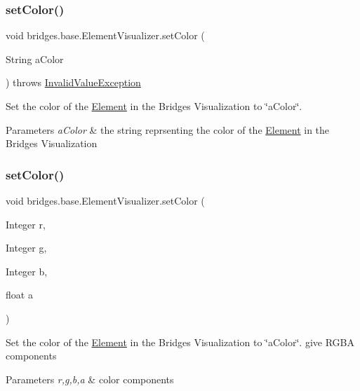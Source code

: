 \subsubsection{\texorpdfstring{set\+Color()}{setColor()}\hspace{0.1cm}{\footnotesize\ttfamily [1/3]}}
{\footnotesize\ttfamily void bridges.\+base.\+Element\+Visualizer.\+set\+Color (\begin{DoxyParamCaption}\item[{String}]{a\+Color }\end{DoxyParamCaption}) throws \hyperlink{classbridges_1_1validation_1_1_invalid_value_exception}{Invalid\+Value\+Exception}}

Set the color of the \hyperlink{classbridges_1_1base_1_1_element}{Element} in the Bridges Visualization to \char`\"{}a\+Color\char`\"{}. 
\begin{DoxyParams}{Parameters}
{\em a\+Color} & the string reprsenting the color of the \hyperlink{classbridges_1_1base_1_1_element}{Element} in the Bridges Visualization \\
\hline
\end{DoxyParams}
\hypertarget{classbridges_1_1base_1_1_element_visualizer_a84fad1c8abe43b20c68c1800d7630918}{}\label{classbridges_1_1base_1_1_element_visualizer_a84fad1c8abe43b20c68c1800d7630918} 
\subsubsection{\texorpdfstring{set\+Color()}{setColor()}\hspace{0.1cm}{\footnotesize\ttfamily [2/3]}}
{\footnotesize\ttfamily void bridges.\+base.\+Element\+Visualizer.\+set\+Color (\begin{DoxyParamCaption}\item[{Integer}]{r,  }\item[{Integer}]{g,  }\item[{Integer}]{b,  }\item[{float}]{a }\end{DoxyParamCaption})}

Set the color of the \hyperlink{classbridges_1_1base_1_1_element}{Element} in the Bridges Visualization to \char`\"{}a\+Color\char`\"{}. give R\+G\+BA components


\begin{DoxyParams}{Parameters}
{\em r,g,b,a} & color components \\
\hline
\end{DoxyParams}
\hypertarget{classbridges_1_1base_1_1_element_visualizer_a33172ab908f3b6f9740727b0bfe91565}{}\label{classbridges_1_1base_1_1_element_visualizer_a33172ab908f3b6f9740727b0bfe91565} 
